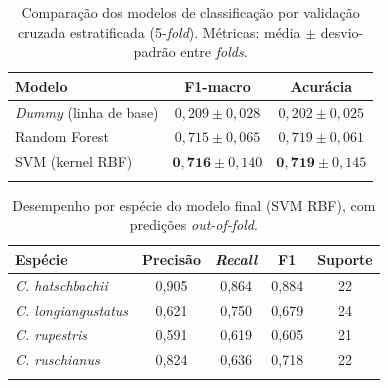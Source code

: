 
\begin{table}[htbp]
\caption{Comparação dos modelos de classificação por validação cruzada estratificada (5-\textit{fold}). Métricas: média $\pm$ desvio-padrão entre \textit{folds}.}\label{tab:ml_modelos}
\begin{tabular*}{\textwidth}{@{\extracolsep\fill}lcc@{}}
\toprule
Modelo & F1-macro & Acurácia \\
\midrule
\textit{Dummy} (linha de base) & $0{,}209 \pm 0{,}028$ & $0{,}202 \pm 0{,}025$ \\
Random Forest                  & $0{,}715 \pm 0{,}065$ & $0{,}719 \pm 0{,}061$ \\
SVM (kernel RBF)               & $\mathbf{0{,}716} \pm 0{,}140$ & $\mathbf{0{,}719} \pm 0{,}145$ \\
\botrule
\end{tabular*}
\end{table}

\begin{table}[htbp]
\caption{Desempenho por espécie do modelo final (SVM RBF), com predições \textit{out-of-fold}.}\label{tab:ml_classes}
\begin{tabular*}{\textwidth}{@{\extracolsep\fill}lcccc@{}}
\toprule
Espécie & Precisão & \textit{Recall} & F1 & Suporte \\
\midrule
\textit{C. hatschbachii}    & 0{,}905 & 0{,}864 & 0{,}884 & 22 \\
\textit{C. longiangustatus} & 0{,}621 & 0{,}750 & 0{,}679 & 24 \\
\textit{C. rupestris}       & 0{,}591 & 0{,}619 & 0{,}605 & 21 \\
\textit{C. ruschianus}      & 0{,}824 & 0{,}636 & 0{,}718 & 22 \\
\botrule
\end{tabular*}
\end{table}

